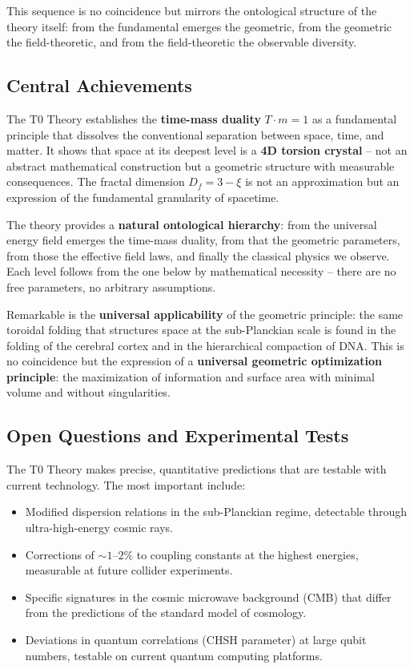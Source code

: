 \documentclass[11pt,openright,twoside]{book}
\begin{document}
This sequence is no coincidence but mirrors the ontological structure of the theory itself: from the fundamental emerges the geometric, from the geometric the field-theoretic, and from the field-theoretic the observable diversity.

\subsection*{Central Achievements}

The T0 Theory establishes the \textbf{time-mass duality} $T \cdot m = 1$ as a fundamental principle that dissolves the conventional separation between space, time, and matter. It shows that space at its deepest level is a \textbf{4D torsion crystal} -- not an abstract mathematical construction but a geometric structure with measurable consequences. The fractal dimension $D_f = 3 - \xi$ is not an approximation but an expression of the fundamental granularity of spacetime.

The theory provides a \textbf{natural ontological hierarchy}: from the universal energy field emerges the time-mass duality, from that the geometric parameters, from those the effective field laws, and finally the classical physics we observe. Each level follows from the one below by mathematical necessity -- there are no free parameters, no arbitrary assumptions.

Remarkable is the \textbf{universal applicability} of the geometric principle: the same toroidal folding that structures space at the sub-Planckian scale is found in the folding of the cerebral cortex and in the hierarchical compaction of DNA. This is no coincidence but the expression of a \textbf{universal geometric optimization principle}: the maximization of information and surface area with minimal volume and without singularities.

\subsection*{Open Questions and Experimental Tests}

The T0 Theory makes precise, quantitative predictions that are testable with current technology. The most important include:

\begin{itemize}[label=$\bullet$]
	\item Modified dispersion relations in the sub-Planckian regime, detectable through ultra-high-energy cosmic rays.
	\item Corrections of $\sim 1$--$2\%$ to coupling constants at the highest energies, measurable at future collider experiments.
	\item Specific signatures in the cosmic microwave background (CMB) that differ from the predictions of the standard model of cosmology.
	\item Deviations in quantum correlations (CHSH parameter) at large qubit numbers, testable on current quantum computing platforms.
\end{itemize}
\end{document}
